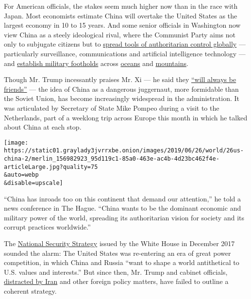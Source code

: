 For American officials, the stakes seem much higher now than in the race
with Japan. Most economists estimate China will overtake the United
States as the largest economy in 10 to 15 years. And some senior
officials in Washington now view China as a steely ideological rival,
where the Communist Party aims not only to subjugate citizens but to
\href{https://www.nytimes3xbfgragh.onion/2019/04/24/technology/ecuador-surveillance-cameras-police-government.html}{spread
tools of authoritarian control globally} --- particularly surveillance,
communications and artificial intelligence technology --- and
\href{https://www.nytimes3xbfgragh.onion/2018/09/20/world/asia/south-china-sea-navy.html}{establish
military footholds} across
\href{https://www.nytimes3xbfgragh.onion/2017/02/25/world/africa/us-djibouti-chinese-naval-base.html}{oceans}
and
\href{https://www.washingtonpost.com/world/asia_pacific/in-central-asias-forbidding-highlands-a-quiet-newcomer-chinese-troops/2019/02/18/78d4a8d0-1e62-11e9-a759-2b8541bbbe20_story.html?utm_term=.0322993a30c0}{mountains}.

Though Mr. Trump incessantly praises Mr. Xi --- he said they
\href{https://twitter.com/realdonaldtrump/status/982954355509907457?lang=en}{``will
always be friends''} --- the idea of China as a dangerous juggernaut,
more formidable than the Soviet Union, has become increasingly
widespread in the administration. It was articulated by Secretary of
State Mike Pompeo during a visit to the Netherlands, part of a weeklong
trip across Europe this month in which he talked about China at each
stop.

\texttt{[image: https://static01.graylady3jvrrxbe.onion/images/2019/06/26/world/26us-china-2/merlin\_156982923\_95d119c1-85a0-463e-ac4b-4d23bc462f4e-articleLarge.jpg?quality=75\\\&auto=webp\\\&disable=upscale]}

``China has inroads too on this continent that demand our attention,''
he told a news conference in The Hague. ``China wants to be the dominant
economic and military power of the world, spreading its authoritarian
vision for society and its corrupt practices worldwide.''

The
\href{https://www.whitehouse.gov/wp-content/uploads/2017/12/NSS-Final-12-18-2017-0905.pdf}{National
Security Strategy} issued by the White House in December 2017 sounded
the alarm: The United States was re-entering an era of great power
competition, in which China and Russia ``want to shape a world
antithetical to U.S. values and interests.'' But since then, Mr. Trump
and cabinet officials,
\href{https://www.nytimes3xbfgragh.onion/2019/06/20/world/middleeast/iran-us-drone.html}{distracted
by Iran} and other foreign policy matters, have failed to outline a
coherent strategy.

